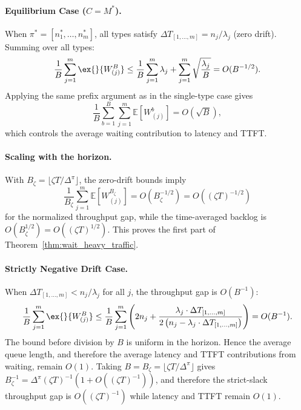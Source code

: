 \paragraph{Equilibrium Case ($C = M^*$).} When $\pi^* = [n_1^*,\ldots,n_m^*]$, all types satisfy $\Delta T_{[1,\ldots,m]} = n_j/\lambda_j$ (zero drift). Summing over all types:
$$\frac{1}{B}\sum_{j=1}^m \ex{}{W^B_{(j)}}\leq \frac{1}{B}\sum_{j=1}^m \lambda_j +\sum_{j=1}^m \sqrt{\frac{\lambda_j}{B}} = O(B^{-1/2}).$$
Applying the same prefix argument as in the single-type case gives
\[
    \frac{1}{B}\sum_{b=1}^B\sum_{j=1}^m \mathbb{E}[W^b_{(j)}]=O(\sqrt{B}),
\]
which controls the average waiting contribution to latency and TTFT.

\paragraph{Scaling with the horizon.} With \(B_\zeta=\lfloor \zeta T/\Delta^\pi\rfloor\), the zero-drift bounds imply
\[
    \frac{1}{B_\zeta}\sum_{j=1}^m \mathbb{E}[W^{B_\zeta}_{(j)}]=O(B_\zeta^{-1/2})=O((\zeta T)^{-1/2})
\]
for the normalized throughput gap, while the time-averaged backlog is \(O(B_\zeta^{1/2})=O((\zeta T)^{1/2})\). This proves the first part of Theorem~\ref{thm:wait_heavy_traffic}.

\paragraph{Strictly Negative Drift Case.} When $\Delta T_{[1,\ldots,m]} < n_j/\lambda_j$ for all $j$, the throughput gap is $O(B^{-1})$:
$$\frac{1}{B}\sum_{j=1}^m \ex{}{W^B_{(j)}}\leq \frac{1}{B}  \sum_{j=1}^m \left(2n_j+ \frac{\lambda_j \cdot \Delta T_{[1,\ldots,m]}}{2\left(n_j - \lambda_j\cdot \Delta T_{[1,\ldots,m]}\right)}\right) = O(B^{-1}).$$
The bound before division by \(B\) is uniform in the horizon. Hence the average queue length, and therefore the average latency and TTFT contributions from waiting, remain \(O(1)\). Taking \(B=B_\zeta=\lfloor \zeta T/\Delta^\pi\rfloor\) gives \(B_\zeta^{-1}=\Delta^\pi(\zeta T)^{-1}(1+O((\zeta T)^{-1}))\), and therefore the strict-slack throughput gap is \(O((\zeta T)^{-1})\) while latency and TTFT remain \(O(1)\).

